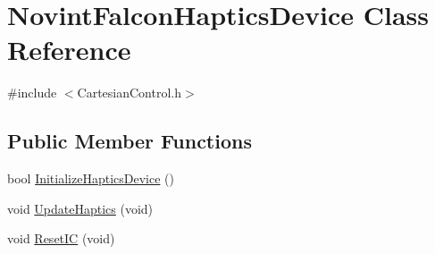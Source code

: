 \hypertarget{classNovintFalconHapticsDevice}{}\section{Novint\+Falcon\+Haptics\+Device Class Reference}
\label{classNovintFalconHapticsDevice}


{\ttfamily \#include $<$Cartesian\+Control.\+h$>$}

\subsection*{Public Member Functions}
\begin{DoxyCompactItemize}
\item 
bool \hyperlink{classNovintFalconHapticsDevice_ac4fe257d1b4ebb3bca073bae6f8a3542}{Initialize\+Haptics\+Device} ()
\item 
void \hyperlink{classNovintFalconHapticsDevice_a6f3fa36cd75a7a4c53950f5552f82ad2}{Update\+Haptics} (void)
\item 
void \hyperlink{classNovintFalconHapticsDevice_a49d2c9beea12a5b1c5b42e9f77d453ad}{Reset\+IC} (void)
\end{DoxyCompactItemize}
